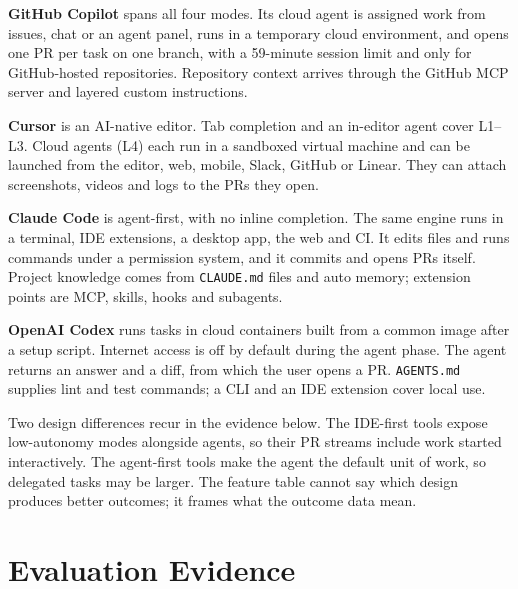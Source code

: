 \documentclass[conference]{IEEEtran}
\begin{document}
\textbf{GitHub Copilot} spans all four modes. Its cloud agent is assigned work from issues, chat or an
agent panel, runs in a temporary cloud environment, and opens one PR per task on one branch, with a
59-minute session limit and only for GitHub-hosted repositories. Repository context arrives through the
GitHub MCP server and layered custom instructions.

\textbf{Cursor} is an AI-native editor. Tab completion and an in-editor agent cover L1--L3. Cloud agents
(L4) each run in a sandboxed virtual machine and can be launched from the editor, web, mobile, Slack, GitHub
or Linear. They can attach screenshots, videos and logs to the PRs they open.

\textbf{Claude Code} is agent-first, with no inline completion. The same engine runs in a terminal, IDE
extensions, a desktop app, the web and CI. It edits files and runs commands under a permission system,
and it commits and opens PRs itself. Project knowledge comes from \texttt{CLAUDE.md} files and auto
memory; extension points are MCP, skills, hooks and subagents.

\textbf{OpenAI Codex} runs tasks in cloud containers built from a common image after a setup script.
Internet access is off by default during the agent phase. The agent returns an answer and a diff, from
which the user opens a PR. \texttt{AGENTS.md} supplies lint and test commands; a CLI and an IDE extension
cover local use.

Two design differences recur in the evidence below. The IDE-first tools expose low-autonomy modes alongside
agents, so their PR streams include work started interactively. The agent-first tools make the agent the
default unit of work, so delegated tasks may be larger. The feature table cannot say which design produces
better outcomes; it frames what the outcome data mean.

\section{Evaluation Evidence}\label{sec:evidence}
\end{document}
